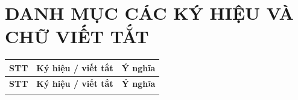 \clearpage
{}
\chapter*{DANH MỤC CÁC KÝ HIỆU VÀ CHỮ VIẾT TẮT}

\begingroup
{}
\setlength{\tabcolsep}{5pt}
\renewcommand{\arraystretch}{1.20}
\noindent
\begin{xltabular}{\textwidth}{|>{\centering\arraybackslash}p{1.0cm}|>{\centering\arraybackslash}p{3.2cm}|X|}
\hline
\textbf{STT} & \textbf{Ký hiệu / viết tắt} & \centering\textbf{Ý nghĩa} \tabularnewline
\hline
\endfirsthead

\hline
\textbf{STT} & \textbf{Ký hiệu / viết tắt} & \centering\textbf{Ý nghĩa} \tabularnewline
\hline
\endhead

\hline
\endfoot

\hline
\endlastfoot


\end{xltabular}
